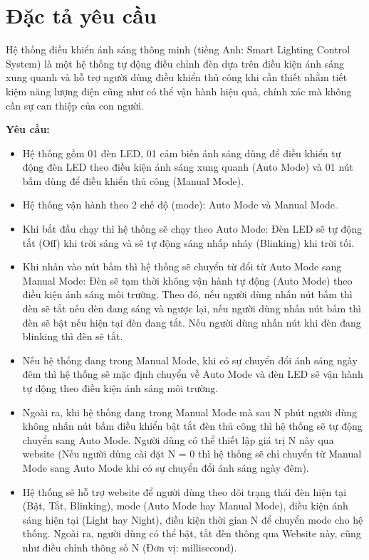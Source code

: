 \section{Đặc tả yêu cầu}
Hệ thống điều khiển ánh sáng thông minh (tiếng Anh: Smart Lighting Control System) là một hệ thống tự động điều chỉnh đèn dựa trên điều kiện ánh sáng xung quanh và hỗ trợ người dùng điều khiển thủ công khi cần thiết nhằm tiết kiệm năng lượng điện cũng như có thể vận hành hiệu quả, chính xác mà không cần sự can thiệp của con người.    

\textbf{Yêu cầu: }
\begin{itemize}
    \item Hệ thống gồm 01 đèn LED, 01 cảm biến ánh sáng dùng để điều khiển tự động đèn LED theo điều kiện ánh sáng xung quanh (Auto Mode) và 01 nút bấm dùng để điều khiển thủ công (Manual Mode).
    \item Hệ thống vận hành theo 2 chế độ (mode): Auto Mode và Manual Mode.
    \item Khi bắt đầu chạy thì hệ thống sẽ chạy theo Auto Mode: Đèn LED sẽ tự động tắt (Off) khi trời sáng và sẽ tự động sáng nhấp nháy (Blinking) khi trời tối.
    \item Khi nhấn vào nút bấm thì hệ thống sẽ chuyển từ đổi từ Auto Mode sang Manual Mode: Đèn sẽ tạm thời không vận hành tự động (Auto Mode) theo điều kiện ánh sáng môi trường. Theo đó, nếu người dùng nhấn nút bấm thì đèn sẽ tắt nếu đèn đang sáng và ngược lại, nếu người dùng nhấn nút bấm thì đèn sẽ bật nếu hiện tại đèn đang tắt. Nếu người dùng nhấn nút khi đèn đang blinking thì đèn sẽ tắt. 
    \item Nếu hệ thống đang trong Manual Mode, khi có sự chuyển đổi ánh sáng ngày đêm thì hệ thống sẽ mặc định chuyển về Auto Mode và đèn LED sẽ vận hành tự động theo điều kiện ánh sáng môi trường.
    \item Ngoài ra, khi hệ thống đang trong Manual Mode mà sau N phút người dùng không nhấn nút bấm điều khiển bật tắt đèn thủ công thì hệ thống sẽ tự động chuyển sang Auto Mode. Người dùng có thể thiết lập giá trị N này qua website (Nếu người dùng cài đặt N = 0 thì hệ thống sẽ chỉ chuyển từ Manual Mode sang Auto Mode khi có sự chuyển đổi ánh sáng ngày đêm).
    \item Hệ thống sẽ hỗ trợ website để người dùng theo dõi trạng thái đèn hiện tại (Bật, Tắt, Blinking), mode (Auto Mode hay Manual Mode), điều kiện ánh sáng hiện tại (Light hay Night), điều kiện thời gian N để chuyển mode cho hệ thống. Ngoài ra, người dùng có thể bật, tắt đèn thông qua Website này, cũng như điều chỉnh thông số N (Đơn vị: millisecond).
\end{itemize}

